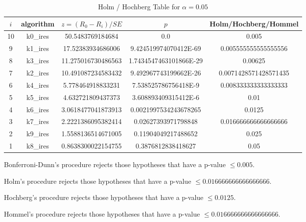 \documentclass[a4paper,10pt]{article}
\begin{document}
\begin{landscape}
\begin{table}[!htp]
\centering\tiny
\caption{Holm / Hochberg Table for $\alpha=0.05$}
\begin{tabular}{ccccc}
$i$&algorithm&$z=(R_0 - R_i)/SE$&$p$&Holm/Hochberg/Hommel\\
\hline
10&k0_ires&50.5483769184684&0.0&0.005\\
9&k1_ires&17.52383934686006&9.424519974070412E-69&0.005555555555555556\\
8&k3_ires&11.275016730486563&1.7434547463101866E-29&0.00625\\
7&k2_ires&10.491087234583432&9.492967743199662E-26&0.0071428571428571435\\
6&k4_ires&5.778464918833231&7.538525786756418E-9&0.008333333333333333\\
5&k5_ires&4.632721809437373&3.608893409315412E-6&0.01\\
4&k6_ires&3.0618477041873913&0.0021997534243678265&0.0125\\
3&k7_ires&2.2221386095382414&0.02627393971798848&0.016666666666666666\\
2&k9_ires&1.5588136514671005&0.11904049217488652&0.025\\
1&k8_ires&0.8638300022154755&0.3876812838418627&0.05\\
\hline
\end{tabular}
\end{table}
Bonferroni-Dunn's procedure rejects those hypotheses that have a p-value $\le0.005$.


Holm's procedure rejects those hypotheses that have a p-value $\le0.016666666666666666$.


Hochberg's procedure rejects those hypotheses that have a p-value $\le0.0125$.


Hommel's procedure rejects those hypotheses that have a p-value $\le0.016666666666666666$.



\end{landscape}
\end{document}
